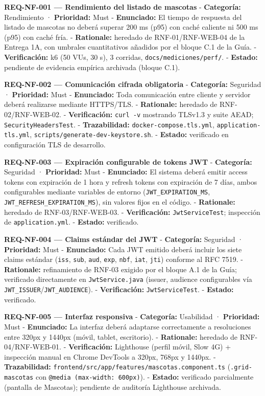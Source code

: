 \documentclass[
]{article}
\begin{document}
\textbf{REQ-NF-001 --- Rendimiento del listado de mascotas} -
\textbf{Categoría:} Rendimiento · \textbf{Prioridad:} Must -
\textbf{Enunciado:} El tiempo de respuesta del listado de mascotas no
deberá superar 200 ms (p95) con caché caliente ni 500 ms (p95) con caché
fría. - \textbf{Rationale:} heredado de RNF-01/RNF-WEB-04 de la Entrega
1A, con umbrales cuantitativos añadidos por el bloque C.1 de la Guía. -
\textbf{Verificación:} k6 (50 VUs, 30 s), 3 corridas,
\texttt{docs/mediciones/perf/}. - \textbf{Estado:} pendiente de
evidencia empírica archivada (bloque C.1).

\textbf{REQ-NF-002 --- Comunicación cifrada obligatoria} -
\textbf{Categoría:} Seguridad · \textbf{Prioridad:} Must -
\textbf{Enunciado:} Toda comunicación entre cliente y servidor deberá
realizarse mediante HTTPS/TLS. - \textbf{Rationale:} heredado de
RNF-02/RNF-WEB-02. - \textbf{Verificación:} \texttt{curl\ -v} mostrando
TLSv1.3 y suite AEAD; \texttt{SecurityHeadersTest}. -
\textbf{Trazabilidad:} \texttt{docker-compose.tls.yml},
\texttt{application-tls.yml}, \texttt{scripts/generate-dev-keystore.sh}.
- \textbf{Estado:} verificado en configuración TLS de desarrollo.

\textbf{REQ-NF-003 --- Expiración configurable de tokens JWT} -
\textbf{Categoría:} Seguridad · \textbf{Prioridad:} Must -
\textbf{Enunciado:} El sistema deberá emitir access tokens con
expiración de 1 hora y refresh tokens con expiración de 7 días, ambos
configurables mediante variables de entorno
(\texttt{JWT\_EXPIRATION\_MS}, \texttt{JWT\_REFRESH\_EXPIRATION\_MS}),
sin valores fijos en el código. - \textbf{Rationale:} heredado de
RNF-03/RNF-WEB-03. - \textbf{Verificación:} \texttt{JwtServiceTest};
inspección de \texttt{application.yml}. - \textbf{Estado:} verificado.

\textbf{REQ-NF-004 --- Claims estándar del JWT} - \textbf{Categoría:}
Seguridad · \textbf{Prioridad:} Must - \textbf{Enunciado:} Cada JWT
emitido deberá incluir los siete claims estándar (\texttt{iss},
\texttt{sub}, \texttt{aud}, \texttt{exp}, \texttt{nbf}, \texttt{iat},
\texttt{jti}) conforme al RFC 7519. - \textbf{Rationale:} refinamiento
de RNF-03 exigido por el bloque A.1 de la Guía; verificado directamente
en \texttt{JwtService.java} (issuer, audience configurables vía
\texttt{JWT\_ISSUER}/\texttt{JWT\_AUDIENCE}). - \textbf{Verificación:}
\texttt{JwtServiceTest}. - \textbf{Estado:} verificado.

\textbf{REQ-NF-005 --- Interfaz responsiva} - \textbf{Categoría:}
Usabilidad · \textbf{Prioridad:} Must - \textbf{Enunciado:} La interfaz
deberá adaptarse correctamente a resoluciones entre 320px y 1440px
(móvil, tablet, escritorio). - \textbf{Rationale:} heredado de
RNF-04/RNF-WEB-01. - \textbf{Verificación:} Lighthouse (perfil móvil,
Slow 4G) + inspección manual en Chrome DevTools a 320px, 768px y 1440px.
- \textbf{Trazabilidad:}
\texttt{frontend/src/app/features/mascotas.component.ts}
(\texttt{.grid-mascotas} con \texttt{@media\ (max-width:\ 600px)}). -
\textbf{Estado:} verificado parcialmente (pantalla de Mascotas);
pendiente de auditoría Lighthouse archivada.
\end{document}
